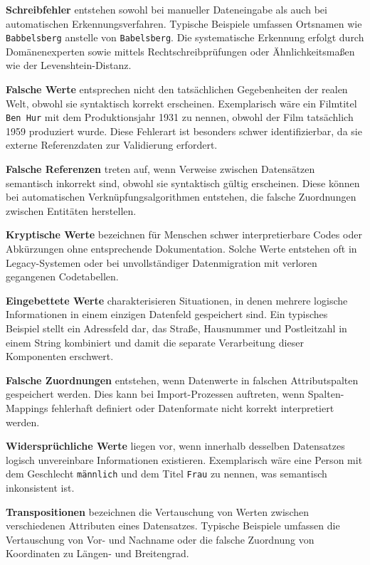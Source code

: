 \documentclass[
    a4paper,
    12pt,
    headinclude=true,
    BCOR=10mm,
]{scrreprt}
\begin{document}
\textbf{Schreibfehler} entstehen sowohl bei manueller Dateneingabe als auch bei automatischen Erkennungsverfahren. Typische Beispiele umfassen Ortsnamen wie \texttt{Babbelsberg} anstelle von \texttt{Babelsberg}. Die systematische Erkennung erfolgt durch Domänenexperten sowie mittels Rechtschreibprüfungen oder Ähnlichkeitsmaßen wie der Levenshtein-Distanz.

\textbf{Falsche Werte} entsprechen nicht den tatsächlichen Gegebenheiten der realen Welt, obwohl sie syntaktisch korrekt erscheinen. Exemplarisch wäre ein Filmtitel \texttt{Ben Hur} mit dem Produktionsjahr 1931 zu nennen, obwohl der Film tatsächlich 1959 produziert wurde. Diese Fehlerart ist besonders schwer identifizierbar, da sie externe Referenzdaten zur Validierung erfordert.

\textbf{Falsche Referenzen} treten auf, wenn Verweise zwischen Datensätzen semantisch inkorrekt sind, obwohl sie syntaktisch gültig erscheinen. Diese können bei automatischen Verknüpfungsalgorithmen entstehen, die falsche Zuordnungen zwischen Entitäten herstellen.

\textbf{Kryptische Werte} bezeichnen für Menschen schwer interpretierbare Codes oder Abkürzungen ohne entsprechende Dokumentation. Solche Werte entstehen oft in Legacy-Systemen oder bei unvollständiger Datenmigration mit verloren gegangenen Codetabellen.

\textbf{Eingebettete Werte} charakterisieren Situationen, in denen mehrere logische Informationen in einem einzigen Datenfeld gespeichert sind. Ein typisches Beispiel stellt ein Adressfeld dar, das Straße, Hausnummer und Postleitzahl in einem String kombiniert und damit die separate Verarbeitung dieser Komponenten erschwert.

\textbf{Falsche Zuordnungen} entstehen, wenn Datenwerte in falschen Attributspalten gespeichert werden. Dies kann bei Import-Prozessen auftreten, wenn Spalten-Mappings fehlerhaft definiert oder Datenformate nicht korrekt interpretiert werden.

\textbf{Widersprüchliche Werte} liegen vor, wenn innerhalb desselben Datensatzes logisch unvereinbare Informationen existieren. Exemplarisch wäre eine Person mit dem Geschlecht \texttt{männlich} und dem Titel \texttt{Frau} zu nennen, was semantisch inkonsistent ist.

\textbf{Transpositionen} bezeichnen die Vertauschung von Werten zwischen verschiedenen Attributen eines Datensatzes. Typische Beispiele umfassen die Vertauschung von Vor- und Nachname oder die falsche Zuordnung von Koordinaten zu Längen- und Breitengrad.
\end{document}
